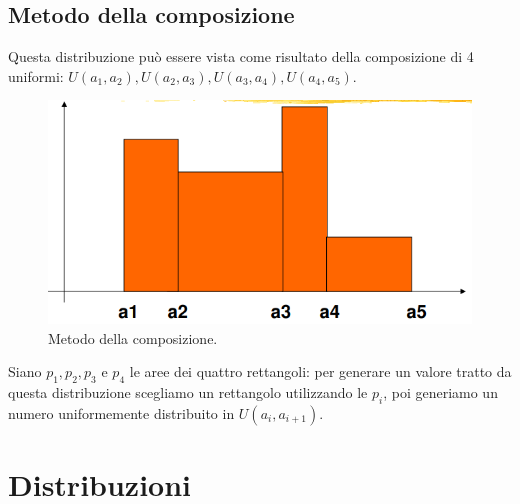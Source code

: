 \subsection{Metodo della composizione}
Questa distribuzione può essere vista come risultato della composizione di 4 uniformi: $U(a_1,a_2), U(a_2,a_3), U(a_3,a_4), U(a_4,a_5)$.
\begin{figure}[H]
	\centering
    \includegraphics[width=15cm, keepaspectratio]{img/metodo_composizione.png}
	\caption{Metodo della composizione.}\label{fig:metodo_composizione}
\end{figure}
Siano $p_1, p_2, p_3$ e $p_4$ le aree dei quattro rettangoli: per generare un valore tratto da questa distribuzione scegliamo un rettangolo utilizzando le $p_i$, poi generiamo un numero uniformemente distribuito in $U(a_i, a_{i+1})$.

\section{Distribuzioni}